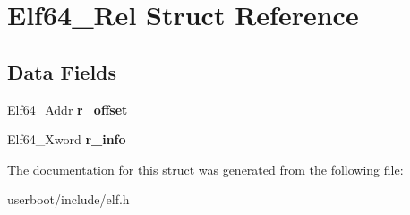 \hypertarget{structElf64__Rel}{}\section{Elf64\+\_\+\+Rel Struct Reference}
\label{structElf64__Rel}
\subsection*{Data Fields}
\begin{DoxyCompactItemize}
\item 
Elf64\+\_\+\+Addr {\bfseries r\+\_\+offset}\hypertarget{structElf64__Rel_af719169bd59569a885bf9d5df794b951}{}\label{structElf64__Rel_af719169bd59569a885bf9d5df794b951}

\item 
Elf64\+\_\+\+Xword {\bfseries r\+\_\+info}\hypertarget{structElf64__Rel_a775740962c9bd1e3f956bd8bffca173b}{}\label{structElf64__Rel_a775740962c9bd1e3f956bd8bffca173b}

\end{DoxyCompactItemize}


The documentation for this struct was generated from the following file\+:\begin{DoxyCompactItemize}
\item 
userboot/include/elf.\+h\end{DoxyCompactItemize}
